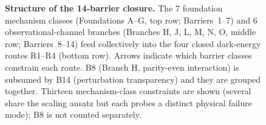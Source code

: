 \documentclass[aps,prd,twocolumn,superscriptaddress,showpacs,preprintnumbers,nofootinbib,longbibliography,floatfix]{revtex4-2}
\begin{document}
\begin{figure}[t]
\caption{\textbf{Structure of the 14-barrier closure.} The 7 foundation
mechanism classes (Foundations A--G, top row; Barriers~1--7) and 6
observational-channel branches (Branches H, J, L, M, N, O, middle row;
Barriers~8--14) feed collectively into the four closed dark-energy routes
R1--R4 (bottom row). Arrows indicate which barrier classes constrain each
route. B8 (Branch H, parity-even interaction) is subsumed by B14
(perturbation transparency) and they are grouped together. Thirteen
mechanism-class constraints are shown (several share the scaling ansatz but each probes a distinct physical failure mode); B8 is not counted separately.
\label{fig:barrier_map}}
\end{figure}
\end{document}
